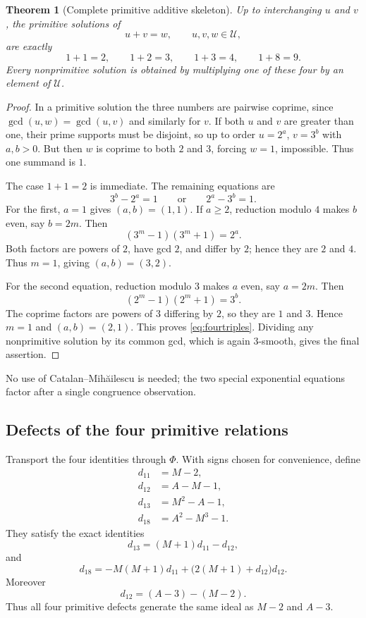 \documentclass[11pt]{article}
\newtheorem{theorem}{Theorem}[section]
\theoremstyle{definition}
\theoremstyle{remark}
\begin{document}
\begin{theorem}[Complete primitive additive skeleton]\label{thm:additiveclassification}
Up to interchanging $u$ and $v$, the primitive solutions of
\[
       u+v=w,\qquad u,v,w\in\mathcal U,
\]
are exactly
\[
       1+1=2,\qquad
       1+2=3,\qquad
       1+3=4,\qquad
       1+8=9.
       \tag{7.1}\label{eq:fourtriples}
\]
Every nonprimitive solution is obtained by multiplying one of these four by an element of
$\mathcal U$.
\end{theorem}
\begin{proof}
In a primitive solution the three numbers are pairwise coprime, since
$\gcd(u,w)=\gcd(u,v)$ and similarly for $v$.  If both $u$ and $v$ are greater than one, their
prime supports must be disjoint, so up to order $u=2^a$, $v=3^b$ with $a,b>0$.  But then $w$
is coprime to both $2$ and $3$, forcing $w=1$, impossible.  Thus one summand is $1$.

The case $1+1=2$ is immediate.  The remaining equations are
\[
       3^b-2^a=1
       \qquad\text{or}\qquad
       2^a-3^b=1.
\]
For the first, $a=1$ gives $(a,b)=(1,1)$.  If $a\ge2$, reduction modulo $4$ makes $b$ even,
say $b=2m$.  Then
\[
       (3^m-1)(3^m+1)=2^a.
\]
Both factors are powers of $2$, have gcd $2$, and differ by $2$; hence they are $2$ and $4$.
Thus $m=1$, giving $(a,b)=(3,2)$.

For the second equation, reduction modulo $3$ makes $a$ even, say $a=2m$.  Then
\[
       (2^m-1)(2^m+1)=3^b.
\]
The coprime factors are powers of $3$ differing by $2$, so they are $1$ and $3$.  Hence
$m=1$ and $(a,b)=(2,1)$.  This proves \eqref{eq:fourtriples}.  Dividing any nonprimitive
solution by its common gcd, which is again $3$-smooth, gives the final assertion.
\end{proof}

No use of Catalan--Mih\u ailescu is needed; the two special exponential equations factor after a
single congruence observation.

\subsection{Defects of the four primitive relations}

Transport the four identities through $\Phi$.  With signs chosen for convenience, define
\[
\begin{aligned}
 d_{11}&=M-2,\\
 d_{12}&=A-M-1,\\
 d_{13}&=M^2-A-1,\\
 d_{18}&=A^2-M^3-1.
\end{aligned}
\tag{7.2}\label{eq:defects}
\]
They satisfy the exact identities
\[
       d_{13}=(M+1)d_{11}-d_{12},
       \tag{7.3}\label{eq:d13}
\]
and
\[
       d_{18}=-M(M+1)d_{11}+\bigl(2(M+1)+d_{12}\bigr)d_{12}.
       \tag{7.4}\label{eq:d18}
\]
Moreover
\[
       d_{12}=(A-3)-(M-2).
\]
Thus all four primitive defects generate the same ideal as $M-2$ and $A-3$.
\end{document}
